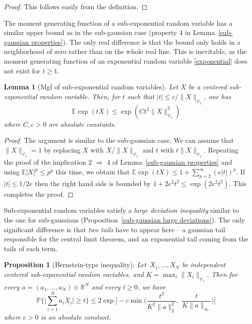 \documentclass[10pt, openany]{book}
\newtheorem{proposition}[theorem]{Proposition}
\newtheorem{lemma}[theorem]{Lemma}
\theoremstyle{remark}
\def \R {\mathbb{R}}
\def \E {\mathbb{E}}
\def \P {\mathbb{P}}
\def \psione {{\psi_1}}
\begin{document}
\begin{proof}
This follows easily from the definition.
\end{proof}

The moment generating function of a sub-exponential random variable has a similar 
upper bound as in the sub-gaussian case (property 4 in Lemma~\ref{sub-gaussian properties}).
The only real difference is that the bound only holds in a neighborhood of zero rather than on the 
whole real line. This is inevitable, as the moment generating function
of an exponential random variable \eqref{exponential} does not exist for $t \ge 1$. 

\begin{lemma}[Mgf of sub-exponential random variables]		\label{sub-exponential mgf}
  Let $X$ be a centered sub-exponential random variable. Then, for $t$ such that
  $|t| \le c/\|X\|_\psione$, one has
  $$
  \E \exp(t X) \le \exp(C t^2 \|X\|_\psione^2)
  $$
  where $C, c > 0$ are absolute constants. 
\end{lemma}

\begin{proof}
The argument is similar to the sub-gaussian case. 
We can assume that $\|X\|_\psione=1$ by replacing $X$ with $X/\|X\|_\psione$
and $t$ with $t \|X\|_\psione$. Repeating the proof of the 
implication 2 $\Rightarrow$ 4 of Lemma~\ref{sub-gaussian properties}
and using $\E|X|^p \le p^p$ this time, we obtain that 
$\E \exp(tX) \le 1 + \sum_{p=2}^\infty (e|t|)^p$.
If $|t| \le 1/2e$ then the right hand side is bounded by $1 + 2e^2 t^2 \le \exp(2e^2 t^2)$.
This completes the proof. 
\end{proof}

Sub-exponential random variables satisfy a  {\em large deviation inequality} 
similar to the one for sub-gaussians (Proposition~\ref{sub-gaussian large deviations}).
The only significant difference is that {\em two tails} have to appear here -- 
a gaussian tail responsible for the central limit theorem, 
and an exponential tail coming from the tails of each term.

\begin{proposition}[Bernstein-type inequality]	 \label{sub-exponential large deviations}
  Let~$X_1,\ldots,X_N$ be independent centered sub-exponential random variables,
  and $K = \max_i \|X_i\|_\psione$. 
  Then for every $a = (a_1,\ldots,a_N) \in \R^N$
  and every $t \ge 0$, we have
  $$
  \P \Big\{ \Big| \sum_{i=1}^N a_i X_i \Big| \ge t \Big\} 
  \le 2 \exp \Big[ -c \min \Big( \frac{t^2}{K^2\|a\|_2^2}, \; \frac{t}{K\|a\|_\infty} \Big) \Big]
  $$  
  where $c>0$ is an absolute constant. 
\end{proposition}
\end{document}
